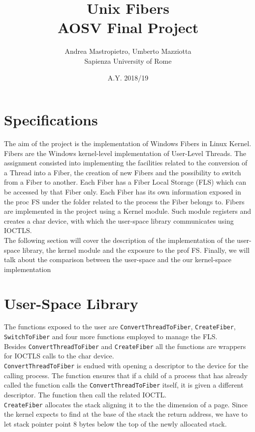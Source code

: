 \documentclass[11pt]{article}
\title{Unix Fibers\\AOSV Final Project}
\author{Andrea Mastropietro, Umberto Mazziotta\\Sapienza University of Rome}
\date{A.Y. 2018/19}
\begin{document}
\maketitle

\section{Specifications}
The aim of the project is the implementation of Windows Fibers in Linux Kernel. Fibers are the Windows kernel-level implementation of User-Level Threads. The assignment consisted into implementing the facilities related to the conversion of a Thread into a Fiber, the creation of new Fibers and the possibility to switch from a Fiber to another. Each Fiber has a Fiber Local Storage (FLS) which can be accessed by that Fiber only. Each Fiber has its own information exposed in the proc FS under the folder related to the process the Fiber belongs to. Fibers are implemented in the project using a Kernel module. Such module registers and creates a char device, with which the user-space library communicates using IOCTLS.\\
The following section will cover the description of the implementation of the user-space library, the kernel module and the exposure to the prof FS. Finally, we will talk about the comparison between the user-space and the our kernel-space implementation 

\section{User-Space Library}
The functions exposed to the user are \texttt{ConvertThreadToFiber}, \texttt{CreateFiber}, \texttt{SwitchToFiber} and four more functions employed to manage the FLS.\\
Besides \texttt{ConvertThreadToFiber} and \texttt{CreateFiber} all the functions are wrappers for IOCTLS calls to the char device.\\
\texttt{ConvertThreadToFiber} is endued with opening a descriptor to the device for the calling process. The function ensures that if a child of a process that has already called the function calls the \texttt{ConvertThreadToFiber} itself, it is given a different descriptor. The function then call the related IOCTL.\\
\texttt{CreateFiber} allocates the stack aligning it to the the dimension of a page. Since the kernel expects to find at the base of the stack the return address, we have to let stack pointer point 8 bytes below the top of the newly allocated stack.
\end{document}
